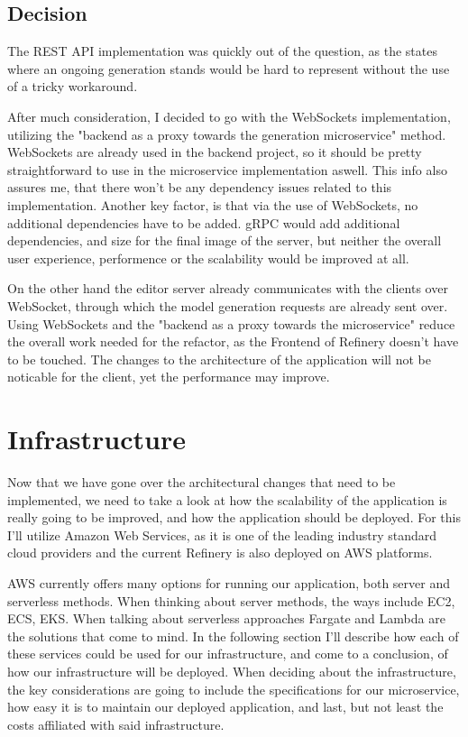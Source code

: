 \subsection{Decision} \label{archdecision}
	The REST API implementation was quickly out of the question, as the states where an ongoing generation stands would be hard to represent
	 without the use of a tricky workaround.

	After much consideration, I decided to go with the WebSockets implementation, utilizing the "backend as a proxy towards the generation microservice" method.
	WebSockets are already used in the backend project, so it should be pretty straightforward to use in the microservice implementation aswell.
	This info also assures me, that there won't be any dependency issues related to this implementation. Another key factor, is that via the use of 
	WebSockets, no additional dependencies have to be added. gRPC would add additional dependencies, and size for the final image of the server,
	but neither the overall user experience, performence or the scalability would be improved at all.

	On the other hand the editor server already communicates with the clients over WebSocket, through which
	the model generation requests are already sent over. Using WebSockets and the "backend as a proxy towards the microservice" reduce the overall work needed for the refactor, 
	as the Frontend of Refinery 
	doesn't have to be touched. The changes to the architecture of the application will not be noticable for the client, yet the performance may improve.

\section{Infrastructure}

	Now that we have gone over the architectural changes that need to be implemented, we need to take a look at how the 
	scalability of the application is really going to be improved, and how the application should be deployed.
	For this I'll utilize Amazon Web Services, as it is one of the leading industry standard cloud providers
	and the current Refinery is also deployed on AWS platforms.

	AWS currently offers many options for running our application, both server and serverless methods.
	When thinking about server methods, the ways include EC2, ECS, EKS. When talking about serverless approaches
	Fargate and Lambda are the solutions that come to mind. In the following section I'll describe how each of these
	services could be used for our infrastructure, and come to a conclusion, of how our infrastructure will be deployed.
	When deciding about the infrastructure, the key considerations are going to include the specifications for our microservice,
	how easy it is to maintain our deployed application, and last, but not least the costs affiliated with said infrastructure.



